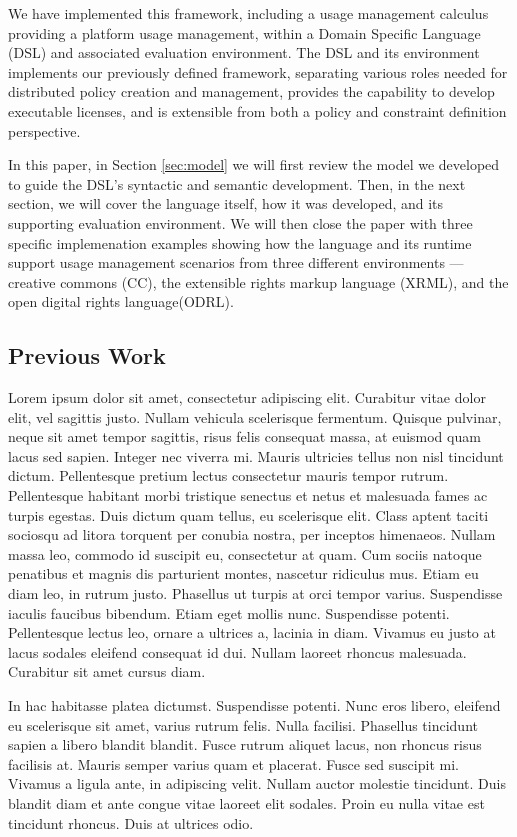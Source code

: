 We have implemented this framework, including a usage management calculus providing a platform usage management, within a Domain Specific Language (DSL) and associated evaluation environment. The DSL and its environment implements our previously defined framework, separating various roles needed for distributed policy creation and management, provides the capability to develop executable licenses, and is extensible from both a policy and constraint definition perspective.

In this paper, in Section \ref{sec:model} we will first review the model we developed to guide the DSL's syntactic and semantic development.  Then, in the next section, we will cover the language itself, how it was developed, and its supporting evaluation environment.  We will then close the paper with three specific implemenation examples showing how the language and its runtime support usage management scenarios from three different environments --- creative commons (CC), the extensible rights markup language (XRML), and the open digital rights language(ODRL).

\subsection{Previous Work}
Lorem ipsum dolor sit amet, consectetur adipiscing elit. Curabitur vitae dolor elit, vel sagittis justo. Nullam vehicula scelerisque fermentum. Quisque pulvinar, neque sit amet tempor sagittis, risus felis consequat massa, at euismod quam lacus sed sapien. Integer nec viverra mi. Mauris ultricies tellus non nisl tincidunt dictum. Pellentesque pretium lectus consectetur mauris tempor rutrum. Pellentesque habitant morbi tristique senectus et netus et malesuada fames ac turpis egestas. Duis dictum quam tellus, eu scelerisque elit. Class aptent taciti sociosqu ad litora torquent per conubia nostra, per inceptos himenaeos. Nullam massa leo, commodo id suscipit eu, consectetur at quam. Cum sociis natoque penatibus et magnis dis parturient montes, nascetur ridiculus mus. Etiam eu diam leo, in rutrum justo. Phasellus ut turpis at orci tempor varius. Suspendisse iaculis faucibus bibendum. Etiam eget mollis nunc. Suspendisse potenti. Pellentesque lectus leo, ornare a ultrices a, lacinia in diam. Vivamus eu justo at lacus sodales eleifend consequat id dui. Nullam laoreet rhoncus malesuada. Curabitur sit amet cursus diam.

In hac habitasse platea dictumst. Suspendisse potenti. Nunc eros libero, eleifend eu scelerisque sit amet, varius rutrum felis. Nulla facilisi. Phasellus tincidunt sapien a libero blandit blandit. Fusce rutrum aliquet lacus, non rhoncus risus facilisis at. Mauris semper varius quam et placerat. Fusce sed suscipit mi. Vivamus a ligula ante, in adipiscing velit. Nullam auctor molestie tincidunt. Duis blandit diam et ante congue vitae laoreet elit sodales. Proin eu nulla vitae est tincidunt rhoncus. Duis at ultrices odio.